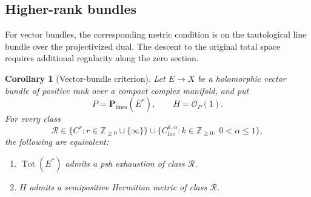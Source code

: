 \documentclass[11pt]{amsart}
\newtheorem{corollary}[theorem]{Corollary}
\theoremstyle{definition}
\theoremstyle{remark}
\numberwithin{equation}{section}
\newcommand{\PP}{\mathbf P}
\newcommand{\OO}{\mathcal O}
\newcommand{\Tot}{\operatorname{Tot}}
\begin{document}
\subsection{Higher-rank bundles}
\label{subsec:vector-bundle-criterion}

For vector bundles, the corresponding metric condition is
on the tautological line bundle over the projectivized dual.
The descent to the original total space requires additional regularity along the zero section.

\begin{corollary}[Vector-bundle criterion]
\label{cor:vector-bundle-criterion}
Let $E\to X$ be a holomorphic vector bundle of positive rank
over a compact complex manifold, and put
\[
 P=\PP_{\mathrm{lines}}(E^*),\qquad H=\OO_P(1).
\]
For every class
\[
 \mathcal R\in
 \{C^r:r\in\mathbb Z_{\ge0}\cup\{\infty\}\}
 \cup\{C^{k,\alpha}_{\mathrm{loc}}:
          k\in\mathbb Z_{\ge0},\ 0<\alpha\le1\},
\]
the following are equivalent:
\begin{enumerate}[label=\textup{(\roman*)},leftmargin=2.5em]
\item $\Tot(E^*)$ admits a psh exhaustion of class $\mathcal R$.
\item $H$ admits a semipositive Hermitian metric of class
      $\mathcal R$.
\end{enumerate}
\end{corollary}
\end{document}
